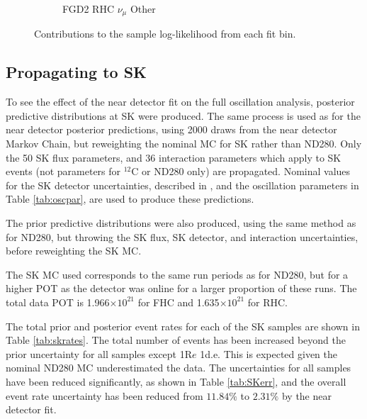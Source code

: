 \begin{figure}[!htbp]
\begin{subfigure}{.32\textwidth}
  \caption{FGD2 RHC $\nu_{\mu}$ Other}
  \label{fig:llhcont_FGD2_NuMuBkg_CCOther_in_AntiNu_Mode}
\end{subfigure}
\caption{Contributions to the sample log-likelihood from each fit bin.}
\label{fig:llhconts}
\end{figure}

\subsection{Propagating to SK}

To see the effect of the near detector fit on the full oscillation analysis, posterior predictive distributions at SK were produced. The same process is used as for the near detector posterior predictions, using 2000 draws from the near detector Markov Chain, but reweighting the nominal MC for SK rather than ND280. Only the 50 SK flux parameters, and 36 interaction parameters which apply to SK events (not parameters for $^{12}$C or ND280 only) are propagated. Nominal values for the SK detector uncertainties, described in \cite{tn399}, and the oscillation parameters in Table \ref{tab:oscpar}, are used to produce these predictions.

The prior predictive distributions were also produced, using the same method as for ND280, but throwing the SK flux, SK detector, and interaction uncertainties, before reweighting the SK MC.

The SK MC used corresponds to the same run periods as for ND280, but for a higher POT as the detector was online for a larger proportion of these runs. The total data POT is 1.966$\times10^{21}$ for FHC and 1.635$\times10^{21}$ for RHC.

The total prior and posterior event rates for each of the SK samples are shown in Table \ref{tab:skrates}. The total number of events has been increased beyond the prior uncertainty for all samples except 1R$e$ 1d.e. This is expected given the nominal ND280 MC underestimated the data. The uncertainties for all samples have been reduced significantly, as shown in Table \ref{tab:SKerr}, and the overall event rate uncertainty has been reduced from $11.84\%$ to $2.31\%$ by the near detector fit. 

